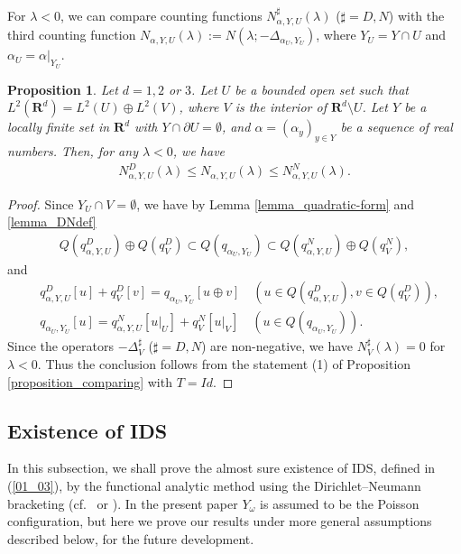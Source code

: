 \documentclass[12pt,a4paper]{article}
\newtheorem{proposition}[theorem]{Proposition}
\begin{document}
For $\lambda<0$,
we can compare counting functions $N^\sharp_{\alpha,Y,U}(\lambda)$
($\sharp=D,N$)
with the third counting function $N_{\alpha,Y,U}(\lambda):=N(\lambda;-\Delta_{\alpha_U,Y_U})$,
where $Y_U=Y\cap U$ and $\alpha_U=\alpha|_{Y_U}$.
\begin{proposition}
 \label{proposition_DNbracketing2}
Let $d=1,2$ or $3$.
Let $U$ be a bounded open set
such that 
$L^2(\mathbf{R}^d)=L^2(U)\oplus L^2(V)$,
where $V$ is the interior of $\mathbf{R}^d\setminus U$.
Let $Y$ be a locally finite set in $\mathbf{R}^d$
with $Y\cap \partial U=\emptyset$,
and $\alpha=(\alpha_y)_{y\in Y}$ be a sequence of real numbers.
Then, for any $\lambda<0$, we have
\begin{align*}
N^D_{\alpha,Y,U}(\lambda)
\leq 
N_{\alpha,Y,U}(\lambda)
\leq
N^N_{\alpha,Y,U}(\lambda).
\end{align*}
\end{proposition}
\begin{proof}
Since $Y_U\cap V=\emptyset$,
we have by Lemma \ref{lemma_quadratic-form} and \ref{lemma_DNdef}
\begin{align*}
 Q(q^D_{\alpha,Y,U})\oplus
 Q(q^D_{V})
\subset
 Q(q_{\alpha_U,Y_U})
\subset
 Q(q^N_{\alpha,Y,U})\oplus
 Q(q^N_{V}),
\end{align*}
and
\begin{align*}
& q^D_{\alpha,Y,U}[u]
+
 q^D_{V}[v]
=
 q_{\alpha_U,Y_U}[u\oplus v]
\quad
(u\in Q(q^D_{\alpha,Y,U}),
v\in Q(q^D_{V})),\\
& 
 q_{\alpha_U,Y_U}[u]
=
q^N_{\alpha,Y,U}[u|_U]
+
q^N_{V}[u|_V]
\quad
(u\in Q(q_{\alpha_U,Y_U})).
\end{align*}
Since the operators $-\Delta^\sharp_{V}$ ($\sharp=D,N$)
are non-negative,
we have $N^\sharp_{V}(\lambda)=0$ 
for $\lambda<0$.
Thus the conclusion follows from the statement (1) of Proposition
\ref{proposition_comparing} with $T=Id$.
\end{proof}


\subsection{Existence of IDS}
\label{subsection_eIDS}
In this subsection,
we shall prove the almost sure existence of IDS,
defined in (\ref{01_03}),
by the functional analytic method
using the Dirichlet--Neumann bracketing (cf.\ \cite{Ca-La} or 
\cite[section 2.3]{Ki-Me}).
In the present paper $Y_\omega$ is assumed to be the
Poisson configuration,
but here we prove our results under more general assumptions
described below,
for the future development.
\end{document}
